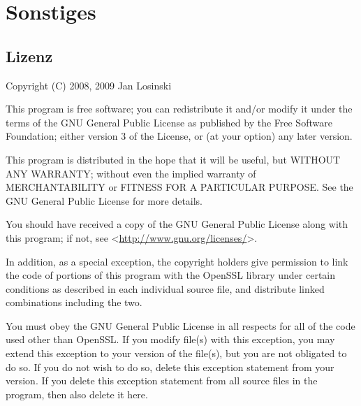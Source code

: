 \documentclass[final,a4paper,11pt,notitlepage,halfparskip]{scrreprt}
\begin{document}
\chapter{Sonstiges}
\section{Lizenz}
Copyright (C) 2008, 2009 Jan Losinski

This program is free software; you can redistribute it and/or modify it under
the terms of the GNU General Public License as published by the Free Software 
Foundation; either version 3 of the License, or (at your option) any later 
version.

This program is distributed in the hope that it will be useful, but WITHOUT ANY 
WARRANTY; without even the implied warranty of MERCHANTABILITY or FITNESS FOR A 
PARTICULAR PURPOSE. See the GNU General Public License for more details.

You should have received a copy of the GNU General Public License along with 
this program; if not, see <\url{http://www.gnu.org/licenses/}>.

In addition, as a special exception, the copyright holders give
permission to link the code of portions of this program with the
OpenSSL library under certain conditions as described in each
individual source file, and distribute linked combinations
including the two.

You must obey the GNU General Public License in all respects
for all of the code used other than OpenSSL.  If you modify
file(s) with this exception, you may extend this exception to your
version of the file(s), but you are not obligated to do so.  If you
do not wish to do so, delete this exception statement from your
version.  If you delete this exception statement from all source
files in the program, then also delete it here.
\end{document}
